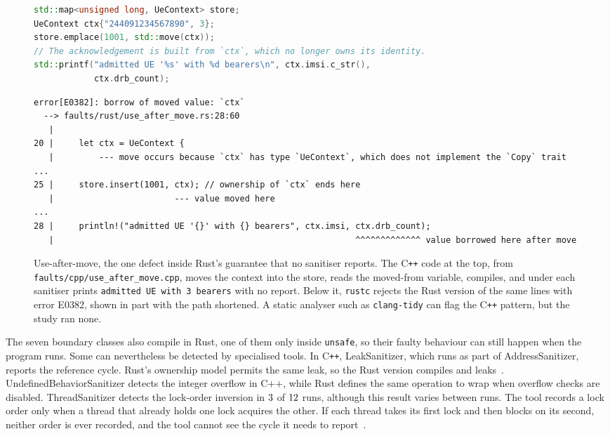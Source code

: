 \documentclass[english,oneside,a4paper,censored,csm,software-track-2020]{HYthesisML}
\begin{document}
\begin{figure}[!ht]
\centering
\begin{minipage}{\linewidth}
\begin{lstlisting}[language=C++]
std::map<unsigned long, UeContext> store;
UeContext ctx{"244091234567890", 3};
store.emplace(1001, std::move(ctx));
// The acknowledgement is built from `ctx`, which no longer owns its identity.
std::printf("admitted UE '%s' with %d bearers\n", ctx.imsi.c_str(),
            ctx.drb_count);
\end{lstlisting}
\medskip
\begin{lstlisting}[basicstyle=\ttfamily\fontsize{7.4}{8.8}\selectfont]
error[E0382]: borrow of moved value: `ctx`
  --> faults/rust/use_after_move.rs:28:60
   |
20 |     let ctx = UeContext {
   |         --- move occurs because `ctx` has type `UeContext`, which does not implement the `Copy` trait
...
25 |     store.insert(1001, ctx); // ownership of `ctx` ends here
   |                        --- value moved here
...
28 |     println!("admitted UE '{}' with {} bearers", ctx.imsi, ctx.drb_count);
   |                                                            ^^^^^^^^^^^^^ value borrowed here after move
\end{lstlisting}
\end{minipage}
\caption[Use-after-move in both languages]{Use-after-move, the one defect
inside Rust's guarantee that no sanitiser reports. The
C\texttt{++} code at the top, from \texttt{faults/cpp/use\_after\_move.cpp},
moves the context into the store, reads the moved-from variable, compiles, and
under each sanitiser prints \texttt{admitted UE \textquotesingle\textquotesingle{} with 3 bearers} with no
report. Below it, \texttt{rustc} rejects the Rust version of the same lines
with error E0382, shown in part with the path shortened. A static analyser such as
\texttt{clang-tidy} can flag the C\texttt{++} pattern, but the study ran
none.\label{fig:uam}}
\end{figure}

The seven boundary classes also compile in Rust, one of them only inside
\texttt{unsafe}, so their faulty behaviour can still happen when the program runs. Some can nevertheless be detected by
specialised tools. In C\texttt{++}, LeakSanitizer, which runs as part of
AddressSanitizer, reports the reference cycle. Rust's ownership model permits
the same leak, so the Rust version compiles and
leaks~\cite{hughes2025gcrust,cui2024rcanary}. UndefinedBehaviorSanitizer detects the
integer overflow in C++, while Rust defines the same operation to wrap when
overflow checks are disabled. ThreadSanitizer detects the lock-order inversion
in $3$ of $12$ runs, although this result varies
between runs. The tool records a lock order only when a thread that already
holds one lock acquires the other. If each thread takes its first lock and then
blocks on its second, neither order is ever recorded, and the tool cannot see
the cycle it needs to report~\cite{tsandeadlock}.
\end{document}
